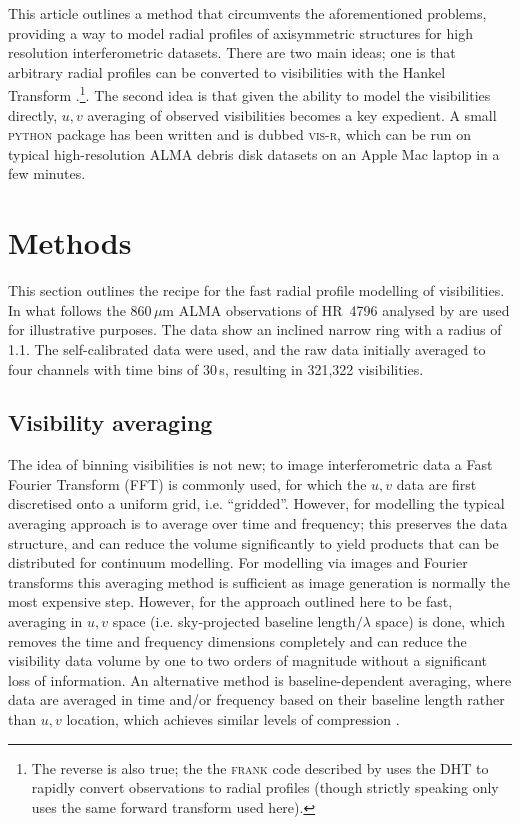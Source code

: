 \documentclass[fleqn,usenatbib]{rasti}
\begin{document}
This article outlines a method that circumvents the aforementioned problems, providing a way to model radial profiles of axisymmetric structures for high resolution interferometric datasets. There are two main ideas; one is that arbitrary radial profiles can be converted to visibilities with the Hankel Transform \citep[in this case the Discrete transform, or DHT,][]{1987CoPhC..43..181J,1994JChPh.101.3936L,2015JOSAA..32..611B}.\footnote{The reverse is also true; the the \textsc{frank} code described by \citet{2020MNRAS.tmp.1491J} uses the DHT to rapidly convert observations to radial profiles (though strictly speaking only uses the same forward transform used here).}. The second idea is that given the ability to model the visibilities directly, $u,v$ averaging of observed visibilities becomes a key expedient. A small \textsc{python} package has been written and is dubbed \textsc{vis-r}, which can be run on typical high-resolution ALMA debris disk datasets on an Apple Mac laptop in a few minutes.

\section{Methods}

This section outlines the recipe for the fast radial profile modelling of visibilities. In what follows the 860\,$\mu$m ALMA observations of HR~4796 analysed by \citet{2018MNRAS.475.4924K} are used for illustrative purposes. The data show an inclined narrow ring with a radius of 1.1\arcsec. The self-calibrated data were used, and the raw data initially averaged to four channels with time bins of 30\,s, resulting in 321,322 visibilities.

\subsection{Visibility averaging}\label{sec:avg}

The idea of binning visibilities is not new; to image interferometric data a Fast Fourier Transform (FFT) is commonly used, for which the $u,v$ data are first discretised onto a uniform grid, i.e. ``gridded''. However, for modelling the typical averaging approach is to average over time and frequency; this preserves the data structure, and can reduce the volume significantly to yield products that can be distributed for continuum modelling. For modelling via images and Fourier transforms this averaging method is sufficient as image generation is normally the most expensive step. However, for the approach outlined here to be fast, averaging in $u,v$ space (i.e. sky-projected baseline length$/\lambda$ space) is done, which removes the time and frequency dimensions completely and can reduce the visibility data volume by one to two orders of magnitude without a significant loss of information. An alternative method is baseline-dependent averaging, where data are averaged in time and/or frequency based on their baseline length rather than $u,v$ location, which achieves similar levels of compression \citep{2018MNRAS.476.2029W}.
\end{document}
